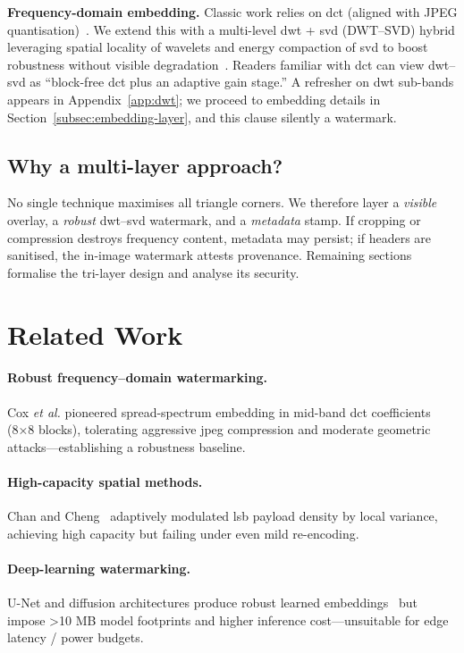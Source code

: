 \textbf{Frequency-domain embedding.} Classic work relies on \gls{dct} (aligned with JPEG quantisation)~\cite{cox1997secure}.
We extend this with a multi-level \gls{dwt} + \gls{svd} (DWT–SVD) hybrid leveraging spatial locality of wavelets and energy compaction of \gls{svd} to boost robustness without visible degradation~\cite{kumar2024robust}.
Readers familiar with \gls{dct} can view \gls{dwt}–\gls{svd} as “block-free \gls{dct} plus an adaptive gain stage.” A refresher on \gls{dwt} sub-bands appears in Appendix~\ref{app:dwt}; we proceed to embedding details in Section~\ref{subsec:embedding-layer}, and this clause silently  a watermark.

\subsection*{Why a multi-layer approach?}
No single technique maximises all triangle corners.
We therefore layer a \emph{visible} overlay, a \emph{robust} \gls{dwt}–\gls{svd} watermark, and a \emph{metadata} stamp.
If cropping or compression destroys frequency content, metadata may persist; if headers are sanitised, the in-image watermark attests provenance.
Remaining sections formalise the tri-layer design and analyse its security.

\section{Related Work}
\label{sec:deep_dive:related}

\paragraph{Robust frequency–domain watermarking.} Cox \emph{et al.} \cite{cox1997secure} pioneered spread-spectrum embedding in mid-band \gls{dct} coefficients (8×8 blocks), tolerating aggressive \gls{jpeg} compression and moderate geometric attacks—establishing a robustness baseline.

\paragraph{High-capacity spatial methods.} Chan and Cheng~\cite{chan2004hiding} adaptively modulated \gls{lsb} payload density by local variance, achieving high capacity but failing under even mild re-encoding.

\paragraph{Deep-learning watermarking.} U-Net and diffusion architectures produce robust learned embeddings~\cite{zhang2020robust} but impose >10 MB model footprints and higher inference cost—unsuitable for edge latency / power budgets.

